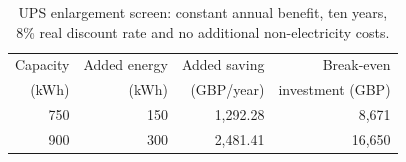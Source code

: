 \begin{table}[htbp]
\centering\small
\caption{UPS enlargement screen: constant annual benefit, ten years, 8\% real discount rate and no additional non-electricity costs.}\label{tab:ups-screen}
\begin{tabular}{@{}rrrr@{}}\toprule
Capacity & Added energy & Added saving & Break-even\\(kWh) & (kWh) & (GBP/year) & investment (GBP) \\\midrule
750 & 150 & 1,292.28 & 8,671 \\
900 & 300 & 2,481.41 & 16,650 \\
\bottomrule\end{tabular}
\end{table}
